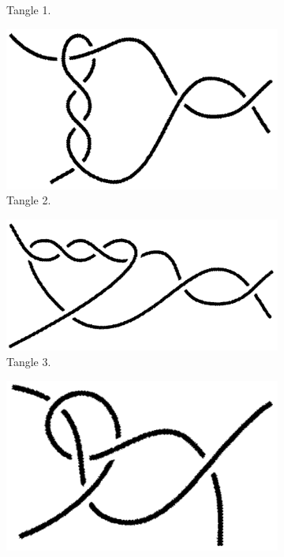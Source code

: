 \documentclass[titlepage]{article}
\numberwithin{figure}{section}
\numberwithin{table}{section}
\numberwithin{equation}{section}
\begin{document}
\begin{itemize}
\begin{figure}[h!]
\begin{subfigure}[b]{0.2\linewidth}
            \caption{Tangle 1.}
            \label{fig:ex2-13a}
        \end{subfigure}
        \begin{subfigure}[b]{0.2\linewidth}
            \centering
            \includegraphics[width=0.8\linewidth]{Blender/ex2-13b.png}
            \caption{Tangle 2.}
            \label{fig:ex2-13b}
        \end{subfigure}
        \begin{subfigure}[b]{0.25\linewidth}
            \centering
            \includegraphics[width=0.8\linewidth]{Blender/ex2-13c.png}
            \caption{Tangle 3.}
            \label{fig:ex2-13c}
        \end{subfigure}
        \begin{subfigure}[b]{0.16\linewidth}
            \centering
            \includegraphics[width=0.8\linewidth]{Blender/ex2-13d.png}

\end{subfigure}
\end{figure}
\end{itemize}
\end{document}
